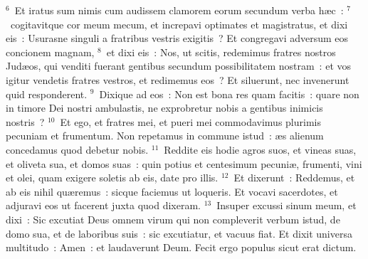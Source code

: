 ${}^{6}$~Et iratus sum nimis cum audissem clamorem eorum secundum verba h\ae c~:
${}^{7}$~cogitavitque cor meum mecum, et increpavi optimates et magistratus, et dixi eis~: Usurasne singuli a fratribus vestris exigitis~? Et congregavi adversum eos concionem magnam,
${}^{8}$~et dixi eis~: Nos, ut scitis, redemimus fratres nostros Jud\ae os, qui venditi fuerant gentibus secundum possibilitatem nostram~: et vos igitur vendetis fratres vestros, et redimemus eos~? Et siluerunt, nec invenerunt quid responderent.
${}^{9}$~Dixique ad eos~: Non est bona res quam facitis~: quare non in timore Dei nostri ambulastis, ne exprobretur nobis a gentibus inimicis nostris~?
${}^{10}$~Et ego, et fratres mei, et pueri mei commodavimus plurimis pecuniam et frumentum. Non repetamus in commune istud~: \ae s alienum concedamus quod debetur nobis.
${}^{11}$~Reddite eis hodie agros suos, et vineas suas, et oliveta sua, et domos suas~: quin potius et centesimum pecuni\ae , frumenti, vini et olei, quam exigere soletis ab eis, date pro illis.
${}^{12}$~Et dixerunt~: Reddemus, et ab eis nihil qu\ae remus~: sicque faciemus ut loqueris. Et vocavi sacerdotes, et adjuravi eos ut facerent juxta quod dixeram.
${}^{13}$~Insuper excussi sinum meum, et dixi~: Sic excutiat Deus omnem virum qui non compleverit verbum istud, de domo sua, et de laboribus suis~: sic excutiatur, et vacuus fiat. Et dixit universa multitudo~: Amen~: et laudaverunt Deum. Fecit ergo populus sicut erat dictum.


